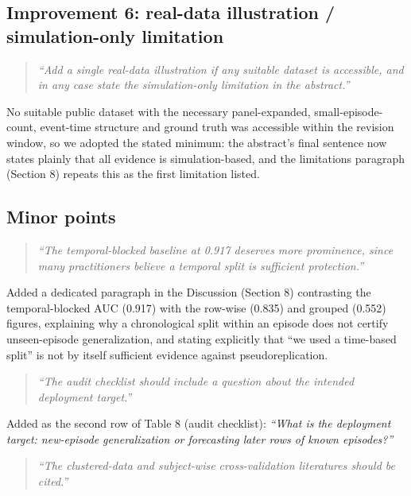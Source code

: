 \documentclass[11pt]{article}
\newcommand{\rc}[1]{\textit{``#1''}}
\newenvironment{response}{\begin{quote}\color{black}}{\end{quote}}
\begin{document}
\subsection*{Improvement 6: real-data illustration / simulation-only limitation}

\begin{response}
\rc{Add a single real-data illustration if any suitable dataset is accessible, and in any case state the simulation-only limitation in the abstract.}
\end{response}

No suitable public dataset with the necessary panel-expanded, small-episode-count, event-time structure and ground truth was accessible within the revision window, so we adopted the stated minimum: the abstract's final sentence now states plainly that all evidence is simulation-based, and the limitations paragraph (Section 8) repeats this as the first limitation listed.

\subsection*{Minor points}

\begin{response}
\rc{The temporal-blocked baseline at 0.917 deserves more prominence, since many practitioners believe a temporal split is sufficient protection.}
\end{response}

Added a dedicated paragraph in the Discussion (Section 8) contrasting the temporal-blocked AUC (0.917) with the row-wise (0.835) and grouped (0.552) figures, explaining why a chronological split within an episode does not certify unseen-episode generalization, and stating explicitly that ``we used a time-based split'' is not by itself sufficient evidence against pseudoreplication.

\begin{response}
\rc{The audit checklist should include a question about the intended deployment target.}
\end{response}

Added as the second row of Table 8 (audit checklist): \emph{``What is the deployment target: new-episode generalization or forecasting later rows of known episodes?''}

\begin{response}
\rc{The clustered-data and subject-wise cross-validation literatures should be cited.}
\end{response}
\end{document}
